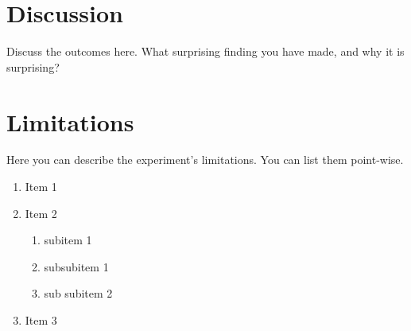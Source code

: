 \section{Discussion}
Discuss the outcomes here. What surprising finding you have made, and why it is surprising?


\section{Limitations}
Here you can describe the experiment's limitations. You can list them point-wise.

\begin{enumerate}
    \item Item 1
    \item Item 2
    \begin{enumerate}
        \item subitem 1  
        \item subsubitem 1
        \item sub subitem 2
    \end{enumerate}
    \item Item 3
\end{enumerate}